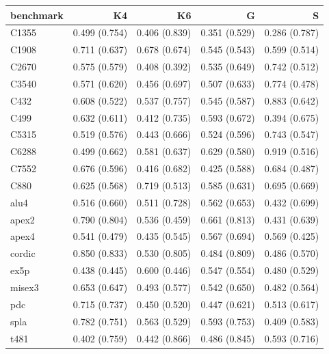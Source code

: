 \begin{tabular}{@{}lrrrr@{}}
\toprule
benchmark & K4 & K6 & G & S \\
\midrule
C1355 & 0.499 (0.754) & 0.406 (0.839) & 0.351 (0.529) & 0.286 (0.787) \\
C1908 & 0.711 (0.637) & 0.678 (0.674) & 0.545 (0.543) & 0.599 (0.514) \\
C2670 & 0.575 (0.579) & 0.408 (0.392) & 0.535 (0.649) & 0.742 (0.512) \\
C3540 & 0.571 (0.620) & 0.456 (0.697) & 0.507 (0.633) & 0.774 (0.478) \\
C432 & 0.608 (0.522) & 0.537 (0.757) & 0.545 (0.587) & 0.883 (0.642) \\
C499 & 0.632 (0.611) & 0.412 (0.735) & 0.593 (0.672) & 0.394 (0.675) \\
C5315 & 0.519 (0.576) & 0.443 (0.666) & 0.524 (0.596) & 0.743 (0.547) \\
C6288 & 0.499 (0.662) & 0.581 (0.637) & 0.629 (0.580) & 0.919 (0.516) \\
C7552 & 0.676 (0.596) & 0.416 (0.682) & 0.425 (0.588) & 0.684 (0.487) \\
C880 & 0.625 (0.568) & 0.719 (0.513) & 0.585 (0.631) & 0.695 (0.669) \\
alu4 & 0.516 (0.660) & 0.511 (0.728) & 0.562 (0.653) & 0.432 (0.699) \\
apex2 & 0.790 (0.804) & 0.536 (0.459) & 0.661 (0.813) & 0.431 (0.639) \\
apex4 & 0.541 (0.479) & 0.435 (0.545) & 0.567 (0.694) & 0.569 (0.425) \\
cordic & 0.850 (0.833) & 0.530 (0.805) & 0.484 (0.809) & 0.486 (0.570) \\
ex5p & 0.438 (0.445) & 0.600 (0.446) & 0.547 (0.554) & 0.480 (0.529) \\
misex3 & 0.653 (0.647) & 0.493 (0.577) & 0.542 (0.650) & 0.482 (0.564) \\
pdc & 0.715 (0.737) & 0.450 (0.520) & 0.447 (0.621) & 0.513 (0.617) \\
spla & 0.782 (0.751) & 0.563 (0.529) & 0.593 (0.753) & 0.409 (0.583) \\
t481 & 0.402 (0.759) & 0.442 (0.866) & 0.486 (0.845) & 0.593 (0.716) \\
\bottomrule
\end{tabular}
